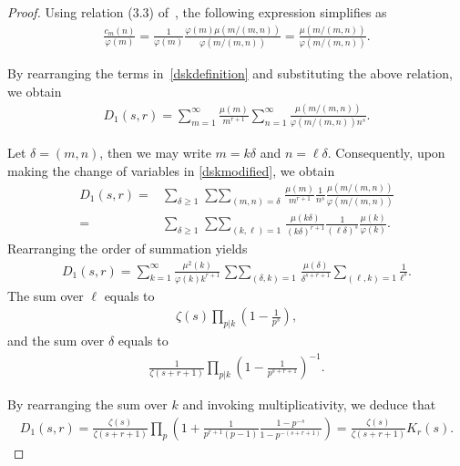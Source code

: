 \documentclass[12pt, oneside,reqno]{amsart}
\numberwithin{equation}{section}
\begin{document}
\begin{proof}
Using relation (3.3) of~\cite[\S 3.2]{iwanieckowlaski}, the following expression simplifies as
\begin{align*}
\frac{c_m(n)}{\varphi(m)}
=\frac{1}{\varphi(m)}\frac{\varphi(m)\mu\left({m}/{(m,n)}\right)}{\varphi\left({m}/{(m,n)}\right)}
=\frac{\mu\left({m}/{(m,n)}\right)}{\varphi\left({m}/{(m,n)}\right)}.
\end{align*}

\noindent
By rearranging the terms in~\eqref{dskdefinition} and substituting the above relation, we obtain
\begin{align}\label{dskmodified}
D_1(s,r)
=\sum_{m=1}^{\infty}\frac{\mu(m)}{m^{r+1}}\sum_{n=1}^{\infty}\frac{\mu({m}/{(m,n)})}{\varphi\left({m}/{(m,n)}\right)n^{s}}.
\end{align}

\noindent
Let $\delta=(m,n)$, then we may write $m=k\delta$ and $n=\ell\delta$. Consequently, upon making the change of variables in \eqref{dskmodified}, we obtain
\begin{align*}
D_1(s,r) 
=&\sum_{\delta\geq 1}\mathop{\sum\sum}_{(m,n)=\delta}\frac{\mu(m)}{m^{r+1}}\frac{1}{n^{s}}\frac{\mu({m}/{(m,n)})}{\varphi\left({m}/{(m,n)}\right)}\\
=&\sum_{\delta\geq 1}\mathop{\sum\sum}_{(k,\ell)=1}\frac{\mu(k\delta)}{(k\delta)^{r+1}}\frac{1}{(\ell\delta)^{s}}\frac{\mu(k)}{\varphi(k)}.
\end{align*}
\noindent
Rearranging the order of summation yields
\begin{align*}
D_1(s,r)
=\sum_{k=1}^{\infty}\frac{\mu^2(k)}{\varphi(k)k^{r+1}}\mathop{\sum\sum}_{(\delta,k)=1}\frac{\mu(\delta)}{\delta^{s+r+1}}\sum_{(\ell,k)=1}\frac{1}{\ell^{s}}.
\end{align*}
\noindent
The sum over $\ell$ equals to
\begin{align*}
\zeta(s)\prod_{p|k}\left(1-\frac{1}{p^{s}}\right),
\end{align*}
and the sum over $\delta$ equals to
\begin{align*}
\frac{1}{\zeta(s+r+1)}\prod_{p|k}\left(1-\frac{1}{p^{s+r+1}}\right)^{-1}.
\end{align*}

\noindent
By rearranging the sum over $k$ and invoking multiplicativity, we deduce that
\begin{align}\label{dskeulerproductform}
D_1(s,r)
=\frac{\zeta(s)}{\zeta(s+r+1)}\prod_p\left(1+\frac{1}{p^{r+1}(p-1)}\frac{1-p^{-{s}}}{1-p^{-(s+r+1)}}\right)
=\frac{\zeta(s)}{\zeta(s+r+1)}K_r(s).
\end{align}


\end{proof}
\end{document}
